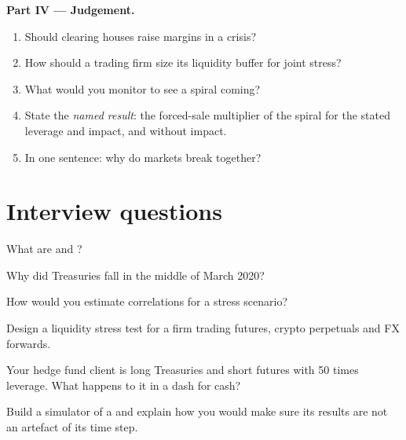 \begin{problem}
\medskip\noindent\textbf{Part IV --- Judgement.}
\begin{enumerate}[resume]
\item Should clearing houses raise margins in a crisis?
\item How should a trading firm size its liquidity buffer for joint stress?
\item What would you monitor to see a spiral coming?
\item State the \emph{named result}: the forced-sale multiplier of the spiral for the stated leverage and impact, and without impact.
\item In one sentence: why do markets break together?
\end{enumerate}
\end{problem}

\section{Interview questions}

\begin{interviewq}\label{iq:m3:when-markets-break-together:1}
What are  and ?
\end{interviewq}

\begin{interviewq}\label{iq:m3:when-markets-break-together:2}
Why did Treasuries fall in the middle of March 2020?
\end{interviewq}

\begin{interviewq}\label{iq:m3:when-markets-break-together:3}
How would you estimate correlations for a stress scenario?
\end{interviewq}

\begin{interviewq}\label{iq:m3:when-markets-break-together:4}
Design a liquidity stress test for a firm trading futures, crypto perpetuals and FX forwards.
\end{interviewq}

\begin{interviewq}\label{iq:m3:when-markets-break-together:5}
Your hedge fund client is long Treasuries and short futures with 50 times leverage. What happens to it in a dash for cash?
\end{interviewq}

\begin{interviewq}\label{iq:m3:when-markets-break-together:6}
Build a simulator of a  and explain how you would make sure its results are not an artefact of its time step.
\end{interviewq}
